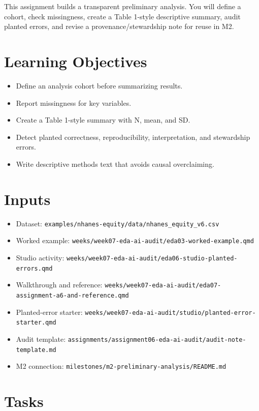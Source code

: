 \documentclass[
  letterpaper,
  DIV=11,
  numbers=noendperiod,
  oneside]{scrreprt}
\providecommand{\tightlist}{%
  \setlength{\itemsep}{0pt}\setlength{\parskip}{0pt}}
\begin{document}
This assignment builds a transparent preliminary analysis. You will
define a cohort, check missingness, create a Table 1-style descriptive
summary, audit planted errors, and revise a provenance/stewardship note
for reuse in M2.

\section{Learning Objectives}\label{learning-objectives-7}

\begin{itemize}
\tightlist
\item
  Define an analysis cohort before summarizing results.
\item
  Report missingness for key variables.
\item
  Create a Table 1-style summary with N, mean, and SD.
\item
  Detect planted correctness, reproducibility, interpretation, and
  stewardship errors.
\item
  Write descriptive methods text that avoids causal overclaiming.
\end{itemize}

\section{Inputs}\label{inputs-7}

\begin{itemize}
\tightlist
\item
  Dataset: \texttt{examples/nhanes-equity/data/nhanes\_equity\_v6.csv}
\item
  Worked example:
  \texttt{weeks/week07-eda-ai-audit/eda03-worked-example.qmd}
\item
  Studio activity:
  \texttt{weeks/week07-eda-ai-audit/eda06-studio-planted-errors.qmd}
\item
  Walkthrough and reference:
  \texttt{weeks/week07-eda-ai-audit/eda07-assignment-a6-and-reference.qmd}
\item
  Planted-error starter:
  \texttt{weeks/week07-eda-ai-audit/studio/planted-error-starter.qmd}
\item
  Audit template:
  \texttt{assignments/assignment06-eda-ai-audit/audit-note-template.md}
\item
  M2 connection: \texttt{milestones/m2-preliminary-analysis/README.md}
\end{itemize}

\section{Tasks}\label{tasks-5}
\end{document}
